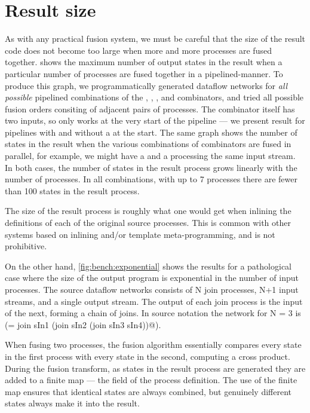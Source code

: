 \section{Result size}

As with any practical fusion system, we must be careful that the size of the result code does not become too large when more and more processes are fused together.
 shows the maximum number of output states in the result when a particular number of processes are fused together in a pipelined-manner.
To produce this graph, we programmatically generated dataflow networks for \emph{all possible} pipelined combinations of the \Hs@map@, \Hs@filter@, \Hs@scan@, \Hs@group@ and \Hs@join@ combinators, and tried all possible fusion orders consiting of adjacent pairs of processes.
The \Hs@join@ combinator itself has two inputs, so only works at the very start of the pipeline --- we present result for pipelines with and without a \Hs@join@ at the start.
The same graph shows the number of states in the result when the various combinations of combinators are fused in parallel, for example, we might have a \Hs@map@ and a \Hs@filter@ processing the same input stream.
In both cases, the number of states in the result process grows linearly with the number of processes. In all combinations, with up to 7 processes there are fewer than 100 states in the result process. 




The size of the result process is roughly what one would get when inlining the definitions of each of the original source processes. This is common with other systems based on inlining and/or template meta-programming, and is not prohibitive.

On the other hand, \cref{fig:bench:exponential} shows the results for a pathological case where the size of the output program is exponential in the number of input processes. The source dataflow networks consists of N join processes, N+1 input streams, and a single output stream. The output of each join process is the input of the next, forming a chain of joins. In source notation the network for N = 3 is (\Hs@sOut = join sIn1 (join sIn2 (join sIn3 sIn4))@).

When fusing two processes, the fusion algorithm essentially compares every state in the first process with every state in the second, computing a cross product. During the fusion transform, as states in the result process are generated they are added to a finite map --- the \Hs@instrs@ field of the process definition. The use of the finite map ensures that identical states are always combined, but genuinely different states always make it into the result. 

